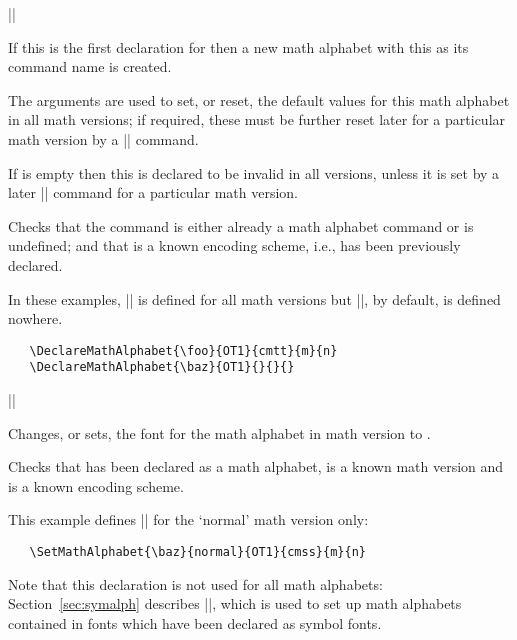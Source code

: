 \documentclass{ltxguide}[1995/11/28]
\begin{document}
\begin{decl}
  |\DeclareMathAlphabet|   
                             
\end{decl}

If this is the first declaration for  then a new math
alphabet with this as its command name is created.

The arguments     are used to
set, or reset, the default values for this math alphabet in all math
versions; if required, these must be further reset later for a
particular math version by a |\SetMathAlphabet| command.

If  is empty then this  is declared to be invalid
in all versions, unless it is set by a later |\SetMathAlphabet| command
for a particular math version.

Checks that the command  is either already a math alphabet
command or is undefined; and that  is a known encoding
scheme, i.e., has been previously declared.

In these examples, |\foo| is defined for all math versions but |\baz|,
by default, is defined nowhere.
\begin{verbatim}
   \DeclareMathAlphabet{\foo}{OT1}{cmtt}{m}{n}
   \DeclareMathAlphabet{\baz}{OT1}{}{}{}
\end{verbatim}


\begin{decl}
  |\SetMathAlphabet|  \\
         \null\hfill {}   
\end{decl}

Changes, or sets, the font for the math alphabet  in math
version  to .

Checks that  has been declared as a math alphabet,
 is a known math version and  is a known encoding
scheme.

This example defines |\baz| for the `normal' math version only:
\begin{verbatim}
   \SetMathAlphabet{\baz}{normal}{OT1}{cmss}{m}{n}
\end{verbatim}

Note that this declaration is not used for all math alphabets:
Section~\ref{sec:symalph} describes |\DeclareSymbolFontAlphabet|, which
is used to set up math alphabets contained in fonts which have been
declared as symbol fonts.
\end{document}
